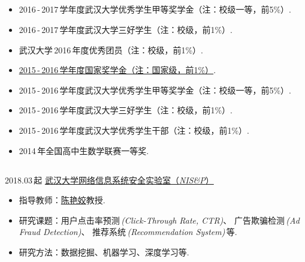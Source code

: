 \documentclass[letterpaper,AutoFakeBold]{twentysecondcv} %
\begin{document}
\begin{CJK*}{UTF8}{gbsn}


\begin{CJK*}{UTF8}{gkai}
\section{}
\end{CJK*}

\begin{itemize}
	\setlength{\itemsep}{0pt}
	\setlength{\parsep}{0pt}
	\setlength{\parskip}{0pt}
	\item 2016\,-\,2017\,学年度武汉大学优秀学生甲等奖学金（注：校级一等，前5\%）.
	\item 2016\,-\,2017\,学年度武汉大学三好学生（注：校级，前1\%）.
	\item 武汉大学\,2016\,年度优秀团员（注：校级，前1\%）.
	\item \href{https://raw.githubusercontent.com/RMSnow/CV/master/materials/NationalScholarship.jpg}
	{2015\,-\,2016\,学年度国家奖学金（注：国家级，前1\%）}.
	\item 2015\,-\,2016\,学年度武汉大学优秀学生甲等奖学金（注：校级一等，前5\%）.
	\item 2015\,-\,2016\,学年度武汉大学三好学生（注：校级，前1\%）.
	\item 2015\,-\,2016\,学年度武汉大学优秀学生干部（注：校级，前1\%）.
	\item 2014\,年全国高中生数学联赛一等奖.
\end{itemize}


\begin{CJK*}{UTF8}{gkai}
\section{}
\end{CJK*}

2018.03\,起 \qquad \href{http://nisplab.whu.edu.cn/index.html}{武汉大学网络信息系统安全实验室（\emph{NIS\&P}）}
\begin{itemize}
	\item 指导教师：\href{http://iqua.ece.toronto.edu/ychen/}{陈艳姣}教授.
	\item 研究课题：用户点击率预测\,\emph{(Click-Through Rate, CTR)}、
	广告欺骗检测\,\emph{(Ad Fraud Detection)}、
	推荐系统\,\emph{(Recommendation System)}\,等.
	\item 研究方法：数据挖掘、机器学习、深度学习等.
\end{itemize}


\end{CJK*}
\end{document}
